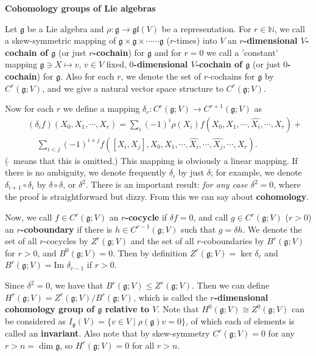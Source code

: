 \documentclass{article}
\newcommand{\NaN}{\mathbb{N}}
\newcommand{\SBar}{\;|\;}
\newcommand{\lie}[1]{\mathfrak{#1}}
\begin{document}
\newpage

\textbf{Cohomology groups of Lie algebras}

 Let $\lie{g}$ be a Lie algebra and $\rho : \lie{g} \to \lie{gl}(V)$ be a representation.
For $r \in \NaN$, we call a skew-symmetric mapping of $\lie{g} \times \lie{g} \times \cdots \cdots \lie{g}$ ($r$-times) into $V$ an \textbf{$r$-dimensional $V$-cochain of $\lie{g}$} (or just \textbf{$r$-cochain}) for $\lie{g}$ and for $r = 0$ we call a 'constant' mapping $\lie{g} \ni X \mapsto v$, $v \in V$ fixed, \textbf{$0$-dimensional $V$-cochain of $\lie{g}$} (or just \textbf{$0$-cochain}) for $\lie{g}$.
Also for each $r$, we denote the set of $r$-cochains for $\lie{g}$ by $C^r(\lie{g}; V)$, and we give a natural vector space structure to $C^r(\lie{g}; V)$.

Now for each $r$ we define a mapping $\delta_r : C^r(\lie{g}; V) \to C^{r + 1}(\lie{g}; V)$ as
\begin{eqnarray*}
  & & (\delta_i f)(X_0, X_1, \cdots, X_r) = \sum_i (-1)^i \rho(X_i) f(X_0, X_1, \cdots, \hat{X_i}, \cdots, X_r) + \\
  & & \;\;\;\; \sum_{i < j} (-1)^{i + j} f([X_i, X_j], X_0, X_1, \cdots, \hat{X_i}, \cdots, \hat{X_j}, \cdots, X_r).
\end{eqnarray*}
($\hat{\;}$ means that this is omitted.)
This mappimg is obviously a linear mapping.
If there is no ambiguity, we denote frequently $\delta_i$ by just $\delta$; for example, we denote $\delta_{i + 1} \circ \delta_i$ by $\delta \circ \delta$, or $\delta^2$.
There is an important result: \textit{for any case $\delta^2 = 0$}, where the proof is straightforward but dizzy.
From this we can say about \textbf{cohomology}.

Now, we call $f \in C^r(\lie{g}; V)$ an \textbf{$r$-cocycle} if $\delta f = 0$, and call $g \in C^r(\lie{g}; V)$ ($r > 0$) an \textbf{$r$-coboundary} if there is $h \in C^{r - 1}(\lie{g}; V)$ such that $g = \delta h$.
We denote the set of all $r$-cocycles by $Z^r(\lie{g}; V)$ and the set of all $r$-coboundaries by $B^r(\lie{g}; V)$ for $r > 0$, and $B^0(\lie{g}; V) = 0$.
Then by definition $Z^r(\lie{g}; V) = \ker{\delta_r}$ and $B^r(\lie{g}; V) = \textrm{Im } \delta_{r - 1}$ if $r > 0$.

Since $\delta^2 = 0$, we have that $B^r(\lie{g}; V) \le Z^r(\lie{g}; V)$.
Then we can define $H^r(\lie{g}; V) = Z^r(\lie{g}; V) / B^r(\lie{g}; V)$, which is called the \textbf{$r$-dimensional cohomology group of $\lie{g}$ relative to $V$}.
Note that $H^0(\lie{g}; V) \cong Z^0(\lie{g}; V)$ can be considered as $I_\lie{g}(V) = \{v \in V \SBar \rho(\lie{g}) v = 0\}$, of which each of elements is called an \textbf{invariant}.
Also note that by skew-symmetry $C^r(\lie{g}; V) = 0$ for any $r > n = \dim{\lie{g}}$, so $H^r(\lie{g}; V) = 0$ for all $r > n$.
\end{document}
